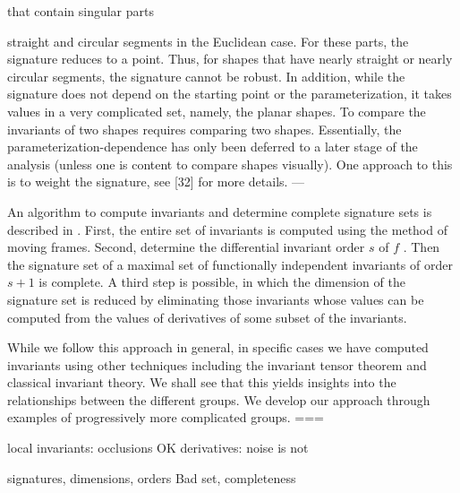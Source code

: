 \documentclass[review,onefignum,onetabnum]{siamonline190516}
\begin{document}
that contain singular parts { straight and circular segments in the Euclidean case. For these
parts, the signature reduces to a point. Thus, for shapes that have nearly straight or nearly
circular segments, the signature cannot be robust. In addition, while the signature does not
depend on the starting point or the parameterization, it takes values in a very complicated set,
namely, the planar shapes. To compare the invariants of two shapes requires comparing two
shapes. Essentially, the parameterization-dependence has only been deferred to a later stage
of the analysis (unless one is content to compare shapes visually). One approach to this is to
weight the signature, see [32] for more details.
---

An algorithm to compute invariants and determine complete signature sets is
described in \cite{olver2001}. First, the entire set of invariants is
computed using the method of moving frames. Second, determine the
differential invariant order $s$ of $f$ . Then the signature set of a maximal
set of functionally independent invariants of order $s+1$ is complete. A
third step is possible, in which the dimension of the signature set is
reduced by eliminating those invariants whose values can be computed from the
values of derivatives of some subset of the invariants.

While we follow this approach in general, in specific cases we have computed invariants using other techniques
including the invariant tensor theorem and classical invariant theory. We shall see that this yields insights into the relationships between the different groups. We develop our approach through examples of progressively more complicated groups.
===


local invariants: occlusions OK
derivatives: noise is not

signatures, dimensions, orders
Bad set, completeness

\begin{figure}
\begin{center}
\end{center}
\end{figure}}
\end{document}
